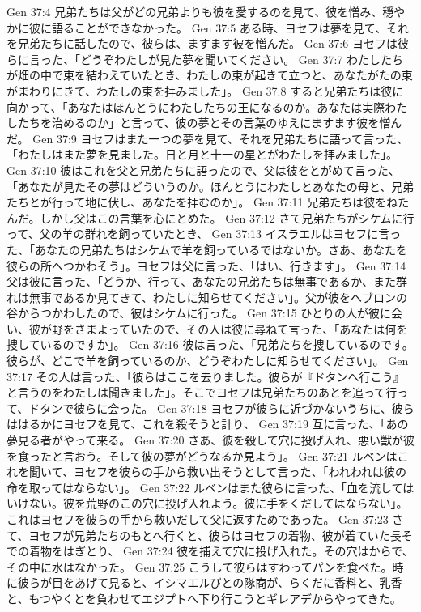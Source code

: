 Gen 37:4  兄弟たちは父がどの兄弟よりも彼を愛するのを見て、彼を憎み、穏やかに彼に語ることができなかった。
Gen 37:5  ある時、ヨセフは夢を見て、それを兄弟たちに話したので、彼らは、ますます彼を憎んだ。
Gen 37:6  ヨセフは彼らに言った、「どうぞわたしが見た夢を聞いてください。
Gen 37:7  わたしたちが畑の中で束を結わえていたとき、わたしの束が起きて立つと、あなたがたの束がまわりにきて、わたしの束を拝みました」。
Gen 37:8  すると兄弟たちは彼に向かって、「あなたはほんとうにわたしたちの王になるのか。あなたは実際わたしたちを治めるのか」と言って、彼の夢とその言葉のゆえにますます彼を憎んだ。
Gen 37:9  ヨセフはまた一つの夢を見て、それを兄弟たちに語って言った、「わたしはまた夢を見ました。日と月と十一の星とがわたしを拝みました」。
Gen 37:10  彼はこれを父と兄弟たちに語ったので、父は彼をとがめて言った、「あなたが見たその夢はどういうのか。ほんとうにわたしとあなたの母と、兄弟たちとが行って地に伏し、あなたを拝むのか」。
Gen 37:11  兄弟たちは彼をねたんだ。しかし父はこの言葉を心にとめた。
Gen 37:12  さて兄弟たちがシケムに行って、父の羊の群れを飼っていたとき、
Gen 37:13  イスラエルはヨセフに言った、「あなたの兄弟たちはシケムで羊を飼っているではないか。さあ、あなたを彼らの所へつかわそう」。ヨセフは父に言った、「はい、行きます」。
Gen 37:14  父は彼に言った、「どうか、行って、あなたの兄弟たちは無事であるか、また群れは無事であるか見てきて、わたしに知らせてください」。父が彼をヘブロンの谷からつかわしたので、彼はシケムに行った。
Gen 37:15  ひとりの人が彼に会い、彼が野をさまよっていたので、その人は彼に尋ねて言った、「あなたは何を捜しているのですか」。
Gen 37:16  彼は言った、「兄弟たちを捜しているのです。彼らが、どこで羊を飼っているのか、どうぞわたしに知らせてください」。
Gen 37:17  その人は言った、「彼らはここを去りました。彼らが『ドタンへ行こう』と言うのをわたしは聞きました」。そこでヨセフは兄弟たちのあとを追って行って、ドタンで彼らに会った。
Gen 37:18  ヨセフが彼らに近づかないうちに、彼らははるかにヨセフを見て、これを殺そうと計り、
Gen 37:19  互に言った、「あの夢見る者がやって来る。
Gen 37:20  さあ、彼を殺して穴に投げ入れ、悪い獣が彼を食ったと言おう。そして彼の夢がどうなるか見よう」。
Gen 37:21  ルベンはこれを聞いて、ヨセフを彼らの手から救い出そうとして言った、「われわれは彼の命を取ってはならない」。
Gen 37:22  ルベンはまた彼らに言った、「血を流してはいけない。彼を荒野のこの穴に投げ入れよう。彼に手をくだしてはならない」。これはヨセフを彼らの手から救いだして父に返すためであった。
Gen 37:23  さて、ヨセフが兄弟たちのもとへ行くと、彼らはヨセフの着物、彼が着ていた長そでの着物をはぎとり、
Gen 37:24  彼を捕えて穴に投げ入れた。その穴はからで、その中に水はなかった。
Gen 37:25  こうして彼らはすわってパンを食べた。時に彼らが目をあげて見ると、イシマエルびとの隊商が、らくだに香料と、乳香と、もつやくとを負わせてエジプトへ下り行こうとギレアデからやってきた。
